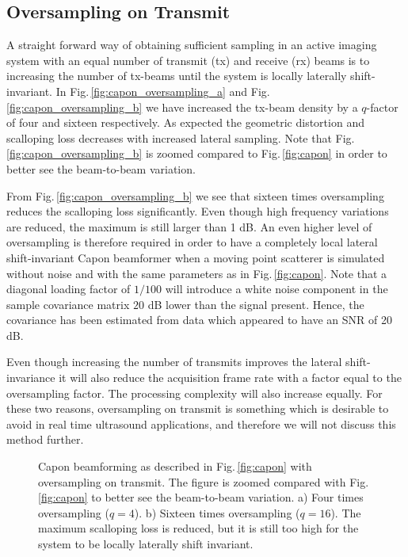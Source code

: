 \documentclass[draftcls]{IEEEtran}
\newcommand{\img}{img/}
\begin{document}
\subsection{Oversampling on Transmit}
A straight forward way of obtaining sufficient sampling in an active imaging system with an equal number of transmit (tx) and receive (rx) beams is to increasing the number of tx-beams until the system is locally laterally shift-invariant. In Fig.\,\ref{fig:capon_oversampling_a} and Fig.\,\ref{fig:capon_oversampling_b} we have increased the tx-beam density by a $q$-factor of four and sixteen respectively. As expected the geometric distortion and scalloping loss decreases with increased lateral sampling. Note that Fig.\,\ref{fig:capon_oversampling_b} is zoomed compared to Fig.\,\ref{fig:capon} in order to better see the beam-to-beam variation.

From Fig.\,\ref{fig:capon_oversampling_b} we see that sixteen times oversampling reduces the scalloping loss significantly. Even though high frequency variations are reduced, the maximum is still larger than 1 dB. An even higher level of oversampling is therefore required in order to have a completely local lateral shift-invariant Capon beamformer when a moving point scatterer is simulated without noise and with the same parameters as in Fig.\,\ref{fig:capon}. %
Note that a diagonal loading factor of $1/100$ will introduce a white noise component in the sample covariance matrix $20$ dB lower than the signal present. Hence, the covariance has been estimated from data which appeared to have an SNR of 20 dB.

Even though increasing the number of transmits improves the lateral shift-invariance it will also reduce the acquisition frame rate with a factor equal to the oversampling factor. The processing complexity will also increase equally. For these two reasons, oversampling on transmit is something which is desirable to avoid in real time ultrasound applications, and therefore we will not discuss this method further.

\begin{figure}[!t]
\centerline{
}
\caption{Capon beamforming as described in Fig.\,\ref{fig:capon} with oversampling on transmit. The figure is zoomed compared with Fig.\,\ref{fig:capon} to better see the beam-to-beam variation. a) Four times oversampling ($q=4$). b) Sixteen times oversampling ($q=16$). The maximum scalloping loss is reduced, but it is still too high for the system to be locally laterally shift invariant.}
\label{fig:capon_oversampling}
\end{figure}
\end{document}
